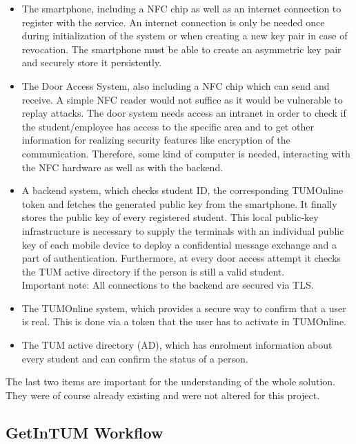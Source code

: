 \begin{itemize}
\item The smartphone, including a NFC chip as well as an internet connection to register with the service.
An internet connection is only be needed once during initialization of the system or when creating a new key pair in case of revocation.
The smartphone must be able to create an asymmetric key pair and securely store it persistently.
\item The Door Access System, also including a NFC chip which can send and receive.
A simple NFC reader would not suffice as it would be vulnerable to replay attacks.
The door system needs access an intranet in order to check if the student/employee has access to the specific area and to get other information for realizing security features like encryption of the communication.
Therefore, some kind of computer is needed, interacting with the NFC hardware as well as with the backend.
\item A backend system, which checks student ID, the corresponding TUMOnline token and fetches the generated public key from the smartphone.
It finally stores the public key of every registered student.
This local public-key infrastructure is necessary to supply the terminals with an individual public key of each mobile device to deploy a confidential message exchange and a part of authentication.
Furthermore, at every door access attempt it checks the TUM active directory if the person is still a valid student.\\
Important note: All connections to the backend are secured via TLS.
\item The TUMOnline system, which provides a secure way to confirm that a user is real.
This is done via a token that the user has to activate in TUMOnline.
\item The TUM active directory (AD), which has enrolment information about every student and can confirm the status of a person.
\end{itemize} 
The last two items are important for the understanding of the whole solution. They were of course already existing and were not altered for this project.

\bigskip




\subsection{GetInTUM Workflow}\label{sec:workflow}

